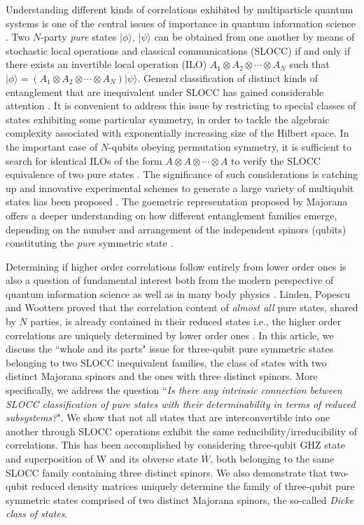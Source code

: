 Understanding different kinds of correlations exhibited by multiparticle quantum systems is one of the  central issues of importance in quantum information science \cite{Niel}. Two $N$-party {\em pure} states $\vert\phi\rangle$, $\vert \psi\rangle$  can be obtained from one another by means of stochastic local operations and classical communications (SLOCC)  if and only if there exists an invertible local operation (ILO) \cite{Dur} $A_1\otimes A_2\otimes \cdots \otimes A_N$ such that $\vert \phi\rangle=\left(A_1\otimes A_2\otimes \cdots \otimes A_N\right)\vert\psi\rangle$. General classification of distinct kinds of entanglement that are inequivalent under SLOCC has gained considerable attention \cite{Dur,Ver,Lamata}. It is convenient to address this issue by restricting to special classes of states exhibiting some particular symmetry, in order to tackle the algebraic complexity associated with exponentially increasing size of the Hilbert space. In the important case of  $N$-qubits obeying permutation symmetry, it is sufficient to search for identical ILOs of the form $A\otimes A\otimes\cdots \otimes A$ to verify the SLOCC equivalence of two pure states \cite{solano,bastin}. The significance of such considerations is catching up and  innovative experimental schemes to generate a large variety of multiqubit states has been proposed \cite{newexpt1,newexpt2}. The goemetric representation proposed by Majorana \cite{majorana} offers a deeper understanding on how different entanglement families emerge, depending on the number and arrangement of the independent spinors (qubits) constituting the {\em pure} symmetric state \cite{solano}. 

Determining if higher order correlations follow entirely from lower order ones is also a question of fundamental interest both from the modern perspective of quantum information science \cite{SP1,SP2,SP2b} as well as in many body physics \cite{Coleman}. Linden, Popescu and Wootters \cite{SP1,SP2,SP2b} proved that the correlation content of {\em almost all} pure states, shared by $N$ parties, is already contained in their reduced states i.e., the higher order correlations are uniquely determined by lower order ones \cite{SP1,SP2,SP2b}. In this article, we discuss the ``whole and its parts" issue for three-qubit pure symmetric states belonging to two SLOCC inequivalent families, the class of states with two distinct Majorana spinors and the ones with three distinct spinors. More specifically, we address the question ``{\em Is there any intrinsic connection between SLOCC classification of pure states with their determinability in terms of reduced subsystems?}". We show that not all states that are interconvertible into one another through SLOCC operations exhibit the same reducibility/irreducibility of correlations. This has been accomplished by considering three-qubit GHZ state and superposition of W and its obverse state $\bar{W}$, both belonging to the same SLOCC family containing three distinct spinors.   We also demonstrate that two-qubit reduced density matrices uniquely determine the family of three-qubit  pure symmetric states comprised of two distinct Majorana spinors, the so-called {\emph {Dicke class of states}}.

